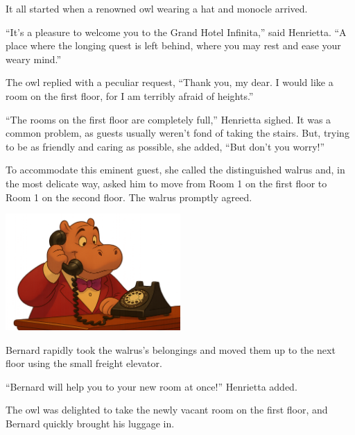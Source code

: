 It all started when a renowned owl wearing a hat and monocle arrived.

``It's a pleasure to welcome you to the Grand Hotel Infinita,'' said Henrietta. ``A place where the longing quest is left behind, where you may rest and ease your weary mind.''

The owl replied with a peculiar request, ``Thank you, my dear. I would like a room on the first floor, for I am terribly afraid of heights.''

``The rooms on the first floor are completely full,'' Henrietta sighed. It was a common problem, as guests usually weren't fond of taking the stairs. But, trying to be as friendly and caring as possible, she added, ``But don't you worry!''

To accommodate this eminent guest, she called the distinguished walrus and, in the most delicate way, asked him to move from Room 1 on the first floor to Room 1 on the second floor. The walrus promptly agreed.

\vfill
\begin{center}
\includegraphics[width=0.5\textwidth]{images/telephone.png}
\end{center}

\clearpage


Bernard rapidly took the walrus's belongings and moved them up to the next floor using the small freight elevator.

``Bernard will help you to your new room at once!'' Henrietta added.

The owl was delighted to take the newly vacant room on the first floor, and Bernard quickly brought his luggage in.

